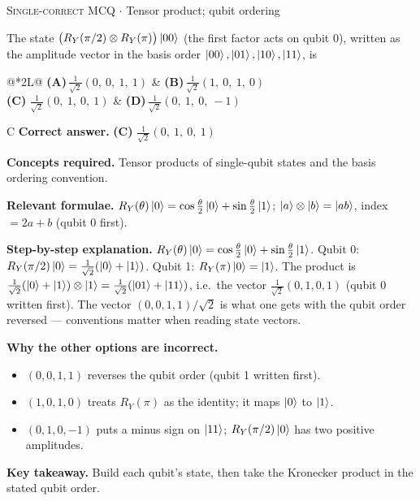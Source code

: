 \documentclass[11pt,a4paper]{article}
\newcommand{\optlabel}[1]{\textbf{(#1)}}
\newcommand{\correctlabel}[1]{\textcolor{okgreen}{\textbf{(#1)}\,\ding{51}}}
\newenvironment{qitem}[1]{\begin{list}{}{\setlength{\leftmargin}{3.3em}\setlength{\labelwidth}{3.1em}%
  \setlength{\labelsep}{0.2em}\setlength{\topsep}{3pt}\setlength{\parsep}{3pt}}\item[\textbf{Q.#1}\hfill]}{\end{list}}
\newcommand{\qsep}{\par\vspace{2pt}{\color{black!15}\hrule}\vspace{4pt}}
\newcommand{\qmeta}[2]{{\footnotesize\color{black!60}\textsc{#1} \;$\cdot$\; #2}\par}
\begin{document}
\begin{qitem}{28}
\qmeta{Single-correct MCQ}{Tensor product; qubit ordering}
The state $\big(R_Y(\pi/2)\otimes R_Y(\pi)\big)\ket{00}$ (the first factor acts on qubit 0), written as the amplitude
vector in the basis order $\ket{00}, \ket{01}, \ket{10}, \ket{11}$, is
\par\smallskip\noindent\begin{tabularx}{\linewidth}{@{}*{2}{L}@{}}
\optlabel{A}\,$\frac{1}{\sqrt2}(0,\ 0,\ 1,\ 1)$ & \optlabel{B}\,$\frac{1}{\sqrt2}(1,\ 0,\ 1,\ 0)$ \\[3pt]
\correctlabel{C}\,$\frac{1}{\sqrt2}(0,\ 1,\ 0,\ 1)$ & \optlabel{D}\,$\frac{1}{\sqrt2}(0,\ 1,\ 0,\ -1)$
\end{tabularx}
\end{qitem}
\begin{solbox}{C}
\textbf{\color{brand}Correct answer.} \textcolor{okgreen}{\textbf{(C)}} $\frac{1}{\sqrt2}(0,\ 1,\ 0,\ 1)$

\textbf{\color{brand}Concepts required.} Tensor products of single-qubit states and the basis ordering convention.

\textbf{\color{brand}Relevant formulae.} $R_Y(\theta)\ket0 = \cos\frac\theta2\ket0 + \sin\frac\theta2\ket1$; $\ket a\otimes\ket b = \ket{ab}$, index $= 2a + b$ (qubit 0 first).

\textbf{\color{brand}Step-by-step explanation.} $R_Y(\theta)\ket0 = \cos\frac\theta2\ket0 + \sin\frac\theta2\ket1$. Qubit 0: $R_Y(\pi/2)\ket0 = \frac{1}{\sqrt2}(\ket0 + \ket1)$.
Qubit 1: $R_Y(\pi)\ket0 = \ket1$. The product is $\frac{1}{\sqrt2}(\ket0 + \ket1)\otimes\ket1 = \frac{1}{\sqrt2}(\ket{01} + \ket{11})$,
i.e.\ the vector $\frac{1}{\sqrt2}(0, 1, 0, 1)$ (qubit 0 written first). The vector $(0, 0, 1, 1)/\sqrt2$ is what one gets with the
qubit order reversed --- conventions matter when reading state vectors.

\textbf{\color{brand}Why the other options are incorrect.}
\begin{itemize}[leftmargin=2.4em, itemsep=1pt, topsep=2pt]
\item[\textbf{(A)}] $(0, 0, 1, 1)$ reverses the qubit order (qubit 1 written first).
\item[\textbf{(B)}] $(1, 0, 1, 0)$ treats $R_Y(\pi)$ as the identity; it maps $\ket0$ to $\ket1$.
\item[\textbf{(D)}] $(0, 1, 0, -1)$ puts a minus sign on $\ket{11}$; $R_Y(\pi/2)\ket0$ has two positive amplitudes.
\end{itemize}
\textbf{\color{brand}Key takeaway.} Build each qubit's state, then take the Kronecker product in the stated qubit order.
\end{solbox}
\qsep
\end{document}
